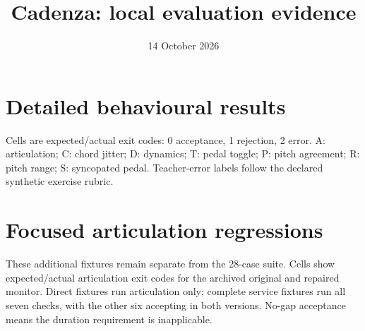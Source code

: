 \documentclass[a4paper,11pt]{article}
\title{Cadenza: local evaluation evidence}
\author{}
\date{14 October 2026}
\begin{document}
\maketitle

\clearpage
\section*{Detailed behavioural results}
Cells are expected/actual exit codes: 0 acceptance, 1 rejection, 2 error.
A: articulation; C: chord jitter; D: dynamics; T: pedal toggle;
P: pitch agreement; R: pitch range; S: syncopated pedal.
Teacher-error labels follow the declared synthetic exercise rubric.
\begin{center}
\resizebox{\textwidth}{!}{}
\end{center}
\clearpage
\section*{Focused articulation regressions}
These additional fixtures remain separate from the 28-case suite.
Cells show expected/actual articulation exit codes for the archived original
and repaired monitor. Direct fixtures run articulation only; complete service
fixtures run all seven checks, with the other six accepting in both versions.
No-gap acceptance means the duration requirement is inapplicable.
\begin{center}
\resizebox{\textwidth}{!}{}
\end{center}
\end{document}
